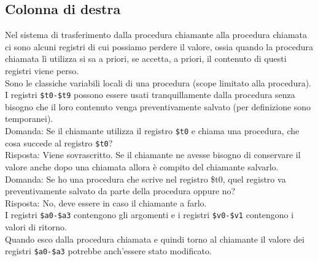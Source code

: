 \documentclass[../main.tex]{subfiles}
\begin{document}
\subsection*{Colonna di destra}
Nel sistema di trasferimento dalla procedura chiamante alla
procedura chiamata ci sono alcuni registri di cui possiamo
perdere il valore, ossia quando la procedura chiamata lì
utilizza si sa a priori, se accetta, a priori, il contenuto
di questi registri viene perso. \\
Sono le classiche variabili locali di una procedura (scope limitato
alla procedura). \\[5mm]
I registri \texttt{\$t0-\$t9} possono essere usati tranquillamente
dalla procedura senza bisogno che il loro contenuto venga
preventivamente salvato (per definizione sono temporanei). \\[3mm]
Domanda: Se il chiamante utilizza il registro \texttt{\$t0} e chiama una procedura,
che cosa succede al registro \texttt{\$t0}? \\
Risposta: Viene sovrascritto.
Se il chiamante ne avesse bisogno di conservare il valore anche
dopo una chiamata allora è compito del chiamante salvarlo. \\[2mm]
Domanda: Se ho una procedura che scrive nel registro \$t0, quel registro va
preventivamente salvato da parte della procedura oppure no? \\
Risposta: No, deve essere in caso il chiamante a farlo. \\[5mm]
I registri \texttt{\$a0-\$a3} contengono gli argomenti e
i registri \texttt{\$v0-\$v1} contengono i valori di ritorno. \\
Quando esco dalla procedura chiamata e quindi torno al chiamante il valore
dei registri \texttt{\$a0-\$a3} potrebbe anch'essere stato modificato.
\end{document}
